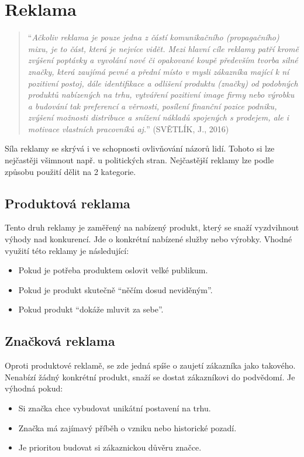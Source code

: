 \section{Reklama}
    \begin{quote}
        \enquote{\emph{Ačkoliv reklama je pouze jedna z částí komunikačního (propagačního) mixu, je to část, která je nejvíce vidět.
        Mezi hlavní cíle reklamy patří kromě zvýšení poptávky a vyvolání nové či opakované koupě především tvorba silné značky,
        která zaujímá pevné a přední místo v mysli zákazníka mající k ní pozitivní postoj, dále identifikace a
        odlišení produktu (značky) od podobných produktů nabízených na trhu,
        vytváření pozitivní image firmy nebo výrobku a budování tak preferencí a věrnosti, posílení finanční pozice podniku,
        zvýšení možnosti distribuce a snížení nákladů spojených s prodejem, ale i motivace vlastních pracovníků aj.}}
        (SVĚTLÍK, J., 2016) \cite{svetlik:marketing}
    \end{quote}
    

    Síla reklamy se skrývá i ve schopnosti ovlivňování názorů lidí. Tohoto si lze nejčastěji všimnout např.
    u politických stran. Nejčastější reklamy lze podle způsobu použití dělit na 2 kategorie. \cite{marketing:product-vs-brand}

    \subsection{Produktová reklama}
    Tento druh reklamy je zaměřený na nabízený produkt, který se snaží vyzdvihnout výhody nad konkurencí.
    Jde o konkrétní nabízené služby nebo výrobky. Vhodné využití této reklamy je následující:
    \begin{itemize}
        \item Pokud je potřeba produktem oslovit velké publikum.
        \item Pokud je produkt skutečně \enquote{něčím dosud neviděným}.
        \item Pokud produkt \enquote{dokáže mluvit za sebe}.
    \end{itemize}

    \subsection{Značková reklama}
    Oproti produktové reklamě, se zde jedná spíše o zaujetí zákazníka jako takového. Nenabízí žádný konkrétní produkt,
    snaží se dostat zákazníkovi do podvědomí. Je výhodná pokud:
    \begin{itemize}
        \item Si značka chce vybudovat unikátní postavení na trhu. 
        \item Značka má zajímavý příběh o vzniku nebo historické pozadí. 
        \item Je prioritou budovat si zákaznickou důvěru značce. 
    \end{itemize}

